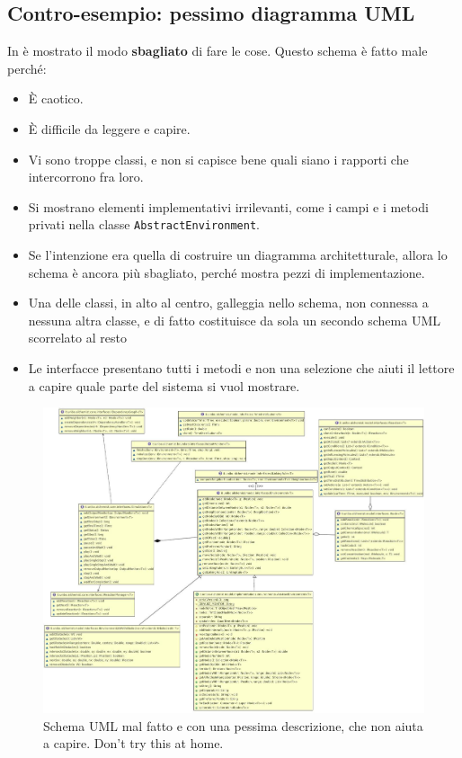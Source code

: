 \documentclass[a4paper,12pt]{report}
\begin{document}
\subsection*{Contro-esempio: pessimo diagramma UML}

In  è mostrato il modo \textbf{sbagliato} di fare le cose.
%
Questo schema è fatto male perché:
\begin{itemize}
	\item È caotico.
	\item È difficile da leggere e capire.
	\item Vi sono troppe classi, e non si capisce bene quali siano i rapporti che intercorrono fra loro.
	\item Si mostrano elementi implementativi irrilevanti, come i campi e i metodi privati nella classe \texttt{AbstractEnvironment}.
	\item Se l'intenzione era quella di costruire un diagramma architetturale, allora lo schema è ancora più sbagliato, perché mostra pezzi di implementazione.
	\item Una delle classi, in alto al centro, galleggia nello schema, non connessa a nessuna altra classe, e di fatto costituisce da sola un secondo schema UML scorrelato al resto
	\item Le interfacce presentano tutti i metodi e non una selezione che aiuti il lettore a capire quale parte del sistema si vuol mostrare.
\end{itemize}


\begin{figure}[h]
	\centering{}
	\includegraphics[width=\textwidth]{img/badarch}
	\caption{Schema UML mal fatto e con una pessima descrizione, che non aiuta a capire. Don't try this at home.}
	\label{img:badarch}
\end{figure}
\end{document}
